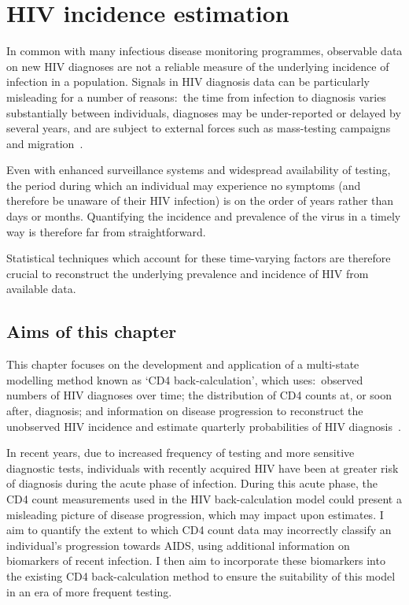 
\chapter{HIV incidence estimation}\label{cha:hivbackcalc}

\graphicspath{{02_HIVBackCalc/Figs/}}

In common with many infectious disease monitoring programmes, observable data on new HIV diagnoses are not a reliable measure of the underlying incidence of infection in a population. Signals in HIV diagnosis data can be particularly misleading for a number of reasons:\ the time from infection to diagnosis varies substantially between individuals, diagnoses may be under-reported or delayed by several years, and are subject to external forces such as mass-testing campaigns and migration~\parencite{Brizzi2017-fv}.

Even with enhanced surveillance systems and widespread availability of testing, the period during which an individual may experience no symptoms (and therefore be unaware of their HIV infection) is on the order of years rather than days or months. Quantifying the incidence and prevalence of the virus in a timely way is therefore far from straightforward.

Statistical techniques which account for these time-varying factors are therefore crucial to reconstruct the underlying prevalence and incidence of HIV from available data.

\section{Aims of this chapter}

This chapter focuses on the development and application of a multi-state modelling method known as `CD4 back-calculation', which uses:\ observed numbers of HIV diagnoses over time; the distribution of CD4 counts at, or soon after, diagnosis; and information on disease progression to reconstruct the unobserved HIV incidence and estimate quarterly probabilities of HIV diagnosis~\parencite{Birrell2012-hw, Brizzi2019-yj}.

In recent years, due to increased frequency of testing and more sensitive diagnostic tests, individuals with recently acquired HIV have been at greater risk of diagnosis during the acute phase of infection. During this acute phase, the CD4 count measurements used in the HIV back-calculation model could present a misleading picture of disease progression, which may impact upon estimates. I aim to quantify the extent to which CD4 count data may incorrectly classify an individual's progression towards AIDS, using additional information on biomarkers of recent infection. I then aim to incorporate these biomarkers into the existing CD4 back-calculation method to ensure the suitability of this model in an era of more frequent testing.

